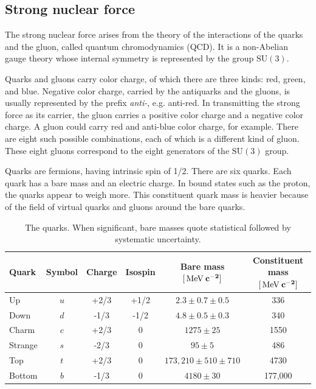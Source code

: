 \subsection{Strong nuclear force}

The strong nuclear force arises from the theory of the interactions of the quarks and the gluon, called quantum chromodynamics (QCD).
It is a non-Abelian gauge theory whose internal symmetry is represented by the group $\mathrm{SU}(3)$.

Quarks and gluons carry color charge, of which there are three kinds: red, green, and blue.
Negative color charge, carried by the antiquarks and the gluons, is usually represented by the prefix \textit{anti-}, e.g. anti-red.
In transmitting the strong force as its carrier, the gluon carries a positive color charge and a negative color charge.
A gluon could carry red and anti-blue color charge, for example.
There are eight such possible combinations, each of which is a different kind of gluon.
These eight gluons correspond to the eight generators of the $\mathrm{SU}(3)$ group.

Quarks are fermions, having intrinsic spin of 1/2. There are six quarks.
Each quark has a bare mass and an electric charge.
In bound states such as the proton, the quarks appear to weigh more.
This constituent quark mass is heavier because of the field of virtual quarks and gluons around the bare quarks.

\begin{table}[ht]
  \caption{The quarks. When significant, bare masses quote statistical followed by systematic uncertainty. \label{tab:quarks}}
  \begin{center} {\scriptsize
  \begin{tabular}{|p{1.5cm}|c|c|c|c|c|}
  \hline
  \bf{Quark} & \bf{Symbol} & \bf{Charge} & \bf{Isospin} & \bf{Bare mass} $\mathbf{[\,\text{Me\hspace{-.08em}V}\:c^{-2}]}$ & \bf{Constituent mass} $\mathbf{[\,\text{Me\hspace{-.08em}V}\:c^{-2}]}$ \\
  \hline
  Up         & $u$         & {+2/3}      & +1/2         & $2.3 \pm 0.7 \pm 0.5    $  & 336                               \\
  Down       & $d$         & {-1/3}      & -1/2         & $4.8 \pm 0.5 \pm 0.3    $  & 340                               \\
  Charm      & $c$         & {+2/3}      & 0            & $1275 \pm 25            $  & 1550                              \\
  Strange    & $s$         & {-2/3}      & 0            & $95 \pm 5               $  & 486                               \\
  Top        & $t$         & {+2/3}      & 0            & $173,210 \pm 510 \pm 710$  & 4730                              \\
  Bottom     & $b$         & {-1/3}      & 0            & $4180 \pm 30            $  & 177,000                           \\
  \hline
  \end{tabular}
  }
  \end{center}
\end{table}

